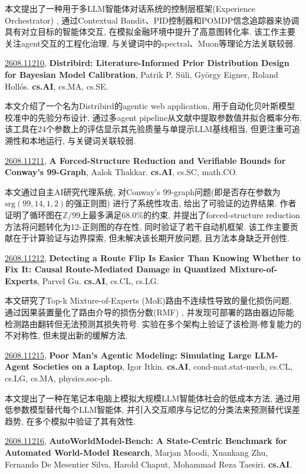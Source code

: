 \documentclass[9pt, a4paper]{article}
\theoremstyle{plain}
\theoremstyle{definition}
\theoremstyle{remark}
\newcommand{\arxivwithtarget}[3]{\hypertarget{#1}{}\href{https://arxiv.org/abs/#1}{#1}, \textbf{\textcolor{arxivblue}{#2}}, #3. }
\begin{document}
本文提出了一种用于多LLM智能体对话系统的控制层框架(Experience Orchestrator) , 通过Contextual Bandit、PID控制器和POMDP信念追踪器来协调具有对立目标的智能体交互, 在模拟金融环境中提升了高意图转化率. 该工作主要关注agent交互的工程化治理, 与关键词中的spectral、Muon等理论方法关联较弱.


\arxivwithtarget{2608.11210}{Distribird: Literature-Informed Prior Distribution Design for Bayesian Model Calibration}{Patrik P. Süli, György Eigner, Roland Hollós}\textbf{cs.AI}, cs.MA, cs.SE.

本文介绍了一个名为Distribird的agentic web application, 用于自动化贝叶斯模型校准中的先验分布设计, 通过多agent pipeline从文献中提取参数值并拟合概率分布. 该工具在24个参数上的评估显示其先验质量与单提示LLM基线相当, 但更注重可追溯性和本地运行, 与关键词关联较弱.


\arxivwithtarget{2608.11211}{A Forced-Structure Reduction and Verifiable Bounds for Conway's 99-Graph}{Aalok Thakkar}\textbf{cs.AI}, cs.SC, math.CO.

本文通过自主AI研究代理系统, 对Conway's 99-graph问题(即是否存在参数为$\mathrm{srg}(99,14,1,2)$的强正则图) 进行了系统性攻击, 给出了可验证的边界结果. 作者证明了循环图在$\mathbb{Z}/99$上最多满足$68.0\%$的约束, 并提出了forced-structure reduction方法将问题转化为12-正则图的存在性, 同时验证了若干自动机框架. 该工作主要贡献在于计算验证与边界探索, 但未解决该长期开放问题, 且方法本身缺乏开创性.


\arxivwithtarget{2608.11212}{Detecting a Route Flip Is Easier Than Knowing Whether to Fix It: Causal Route-Mediated Damage in Quantized Mixture-of-Experts}{Parvel Gu}\textbf{cs.AI}, cs.CL, cs.LG.

本文研究了Top-k Mixture-of-Experts (MoE)路由不连续性导致的量化损伤问题, 通过因果装置量化了路由介导的损伤分数(RMF) , 并发现可部署的路由器边际能检测路由翻转但无法预测其损失符号. 实验在多个架构上验证了该检测-修复能力的不对称性, 但未提出新的缓解方法.


\arxivwithtarget{2608.11215}{Poor Man's Agentic Modeling: Simulating Large LLM-Agent Societies on a Laptop}{Igor Itkin}\textbf{cs.AI}, cond-mat.stat-mech, cs.CL, cs.LG, cs.MA, physics.soc-ph.

本文提出了一种在笔记本电脑上模拟大规模LLM智能体社会的低成本方法, 通过用低参数模型替代每个LLM智能体, 并引入交互顺序与记忆的分类法来预测替代误差趋势, 在多个模拟中验证了其有效性.


\arxivwithtarget{2608.11216}{AutoWorldModel-Bench: A State-Centric Benchmark for Automated World-Model Research}{Marjan Moodi, Xuankang Zhu, Fernando De Mesentier Silva, Harold Chaput, Mohammad Reza Taesiri}\textbf{cs.AI}.
\end{document}
